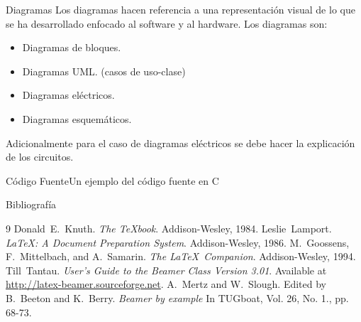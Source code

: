 \documentclass{beamer}
\begin{document}
\begin{darkframes}
    \begin{frame}{Diagramas}
Los diagramas hacen referencia a una representación visual de lo que se ha desarrollado enfocado al software y al hardware. Los diagramas son:
\begin{itemize}
    \item Diagramas de bloques.
    \item Diagramas UML. (casos de uso-clase)
    \item Diagramas eléctricos.
    \item Diagramas esquemáticos.
\end{itemize}
Adicionalmente para el caso de diagramas eléctricos se debe hacer la explicación de los circuitos.
    \end{frame}
    \begin{frame}{Código Fuente}{Un ejemplo del código fuente en C}
      \sleepSort
    \end{frame}

    \begin{frame}{Bibliografía}
      \begin{thebibliography}{9}
            Donald~E.~Knuth.
            \emph{The \TeX book}.
            Addison-Wesley, 1984.
            Leslie~Lamport.
            \emph{\LaTeX : A Document Preparation System}.
            Addison-Wesley, 1986.
            M.~Goossens, F.~Mittelbach, and A.~Samarin.
            \emph{The \LaTeX\ Companion}.
            Addison-Wesley, 1994.
            Till~Tantau.
            \emph{User's Guide to the Beamer Class Version 3.01}.
            Available at \url{http://latex-beamer.sourceforge.net}.
            A.~Mertz and W.~Slough.
            Edited by B.~Beeton and K.~Berry.
            \emph{Beamer by example} In TUGboat,
              Vol. 26, No. 1., pp. 68-73.
      \end{thebibliography}
    \end{frame}

  \end{darkframes}
\end{document}
